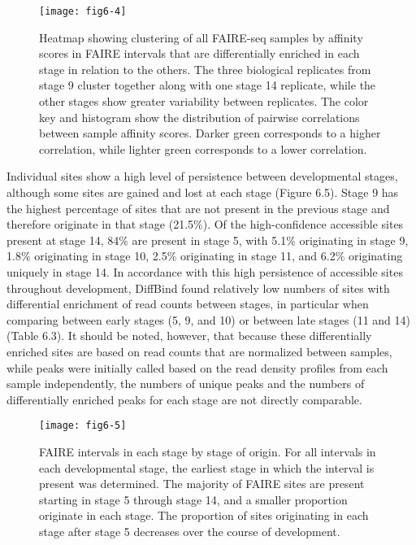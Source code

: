 \begin{figure}
\centering
\texttt{[image: fig6-4]}
\caption{Heatmap showing clustering of all FAIRE-seq samples by affinity scores in FAIRE intervals that are differentially enriched in each stage in relation to the others. The three biological replicates from stage 9 cluster together along with one stage 14 replicate, while the other stages show greater variability between replicates. The color key and histogram show the distribution of pairwise correlations between sample affinity scores. Darker green corresponds to a higher correlation, while lighter green corresponds to a lower correlation.}
\label{Figure 6.4}
\end{figure}

Individual sites show a high level of persistence between developmental stages, although some sites are gained and lost at each stage (Figure 6.5). Stage 9 has the highest percentage of sites that are not present in the previous stage and therefore originate in that stage (21.5\%). Of the high-confidence accessible sites present at stage 14, 84\% are present in stage 5, with 5.1\% originating in stage 9, 1.8\% originating in stage 10, 2.5\% originating in stage 11, and 6.2\% originating uniquely in stage 14. In accordance with this high persistence of accessible sites throughout development, DiffBind found relatively low numbers of sites with differential enrichment of read counts between stages, in particular when comparing between early stages (5, 9, and 10) or between late stages (11 and 14) (Table 6.3). It should be noted, however, that because these differentially enriched sites are based on read counts that are normalized between samples, while peaks were initially called based on the read density profiles from each sample independently, the numbers of unique peaks and the numbers of differentially enriched peaks for each stage are not directly comparable.\\

\begin{figure}
\centering
\texttt{[image: fig6-5]}
\caption{FAIRE intervals in each stage by stage of origin. For all intervals in each developmental stage, the earliest stage in which the interval is present was determined. The majority of FAIRE sites are present starting in stage 5 through stage 14, and a smaller proportion originate in each stage. The proportion of sites originating in each stage after stage 5 decreases over the course of development.}
\label{Figure 6.5}
\end{figure} 

